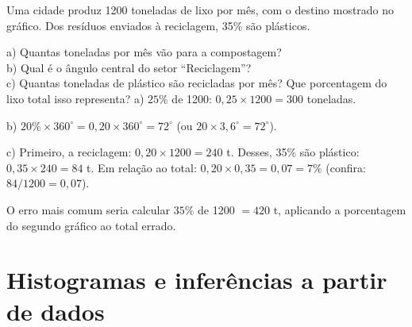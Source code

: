 \begin{exemplo}
Uma cidade produz \num{1200} toneladas de lixo por mês, com o destino mostrado
no gráfico. Dos resíduos enviados à reciclagem, 35\% são plásticos.

\begin{center}
\end{center}

a) Quantas toneladas por mês vão para a compostagem?\\
b) Qual é o ângulo central do setor “Reciclagem”?\\
c) Quantas toneladas de plástico são recicladas por mês? Que porcentagem do lixo total isso representa?
\solucao
a) $25\%$ de \num{1200}: $0{,}25\times\num{1200}=300$ toneladas.

b) $20\%\times 360^\circ=0{,}20\times 360^\circ=72^\circ$ (ou $20\times 3{,}6^\circ=72^\circ$).

c) Primeiro, a reciclagem: $0{,}20\times\num{1200}=240$ t. Desses, 35\% são plástico:
$0{,}35\times 240=84$ t. Em relação ao total:
$0{,}20\times0{,}35=0{,}07=7\%$ (confira: $84/\num{1200}=0{,}07$).

O erro mais comum seria calcular $35\%$ de \num{1200} $=420$ t, aplicando a
porcentagem do segundo gráfico ao total errado.
\end{exemplo}

\section{Histogramas e inferências a partir de dados}

